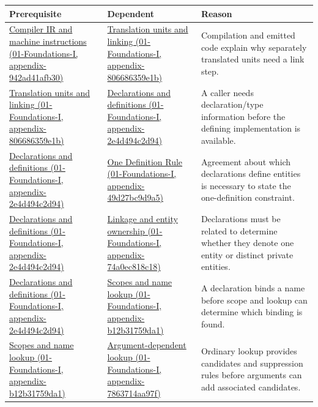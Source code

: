 {\def\LTcaptype{none} %
\begin{longtable}[]{@{}
  >{\raggedright\arraybackslash}p{}
  >{\raggedright\arraybackslash}p{}
  >{\raggedright\arraybackslash}p{}@{}}
\toprule\noalign{}
\begin{minipage}[b]{\linewidth}\raggedright
Prerequisite
\end{minipage} & \begin{minipage}[b]{\linewidth}\raggedright
Dependent
\end{minipage} & \begin{minipage}[b]{\linewidth}\raggedright
Reason
\end{minipage} \\
\midrule\noalign{}
\endhead
\bottomrule\noalign{}
\endlastfoot
\href{}{Compiler IR and machine instructions (01-Foundations-I, appendix-942ad41afb30)} & \href{}{Translation units and linking (01-Foundations-I, appendix-806686359e1b)} & Compilation and emitted code explain why separately translated units need a link step. \\
\href{}{Translation units and linking (01-Foundations-I, appendix-806686359e1b)} & \href{}{Declarations and definitions (01-Foundations-I, appendix-2e4d494c2d94)} & A caller needs declaration/type information before the defining implementation is available. \\
\href{}{Declarations and definitions (01-Foundations-I, appendix-2e4d494c2d94)} & \href{}{One Definition Rule (01-Foundations-I, appendix-49d27bc9d9a5)} & Agreement about which declarations define entities is necessary to state the one-definition constraint. \\
\href{}{Declarations and definitions (01-Foundations-I, appendix-2e4d494c2d94)} & \href{}{Linkage and entity ownership (01-Foundations-I, appendix-74a0ec818c18)} & Declarations must be related to determine whether they denote one entity or distinct private entities. \\
\href{}{Declarations and definitions (01-Foundations-I, appendix-2e4d494c2d94)} & \href{}{Scopes and name lookup (01-Foundations-I, appendix-b12b31759da1)} & A declaration binds a name before scope and lookup can determine which binding is found. \\
\href{}{Scopes and name lookup (01-Foundations-I, appendix-b12b31759da1)} & \href{}{Argument-dependent lookup (01-Foundations-I, appendix-7863714aa97f)} & Ordinary lookup provides candidates and suppression rules before arguments can add associated candidates. \\

\end{longtable}}
